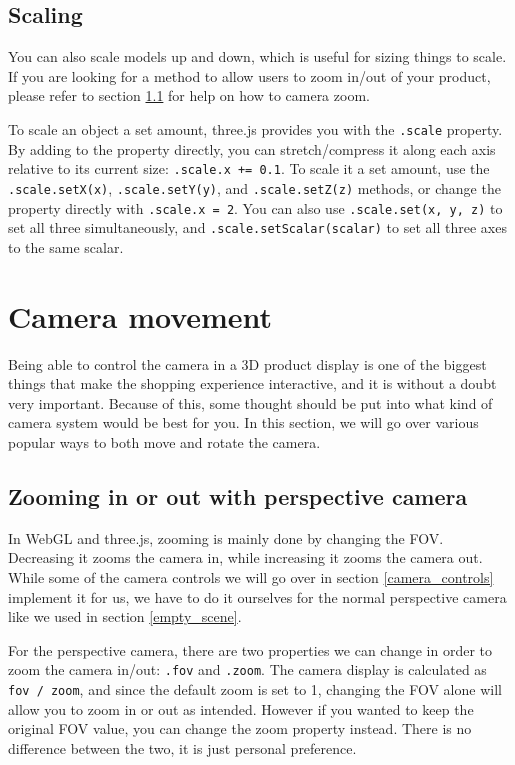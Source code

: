 \documentclass[10pt,final,journal,compsoc]{IEEEtran}
\begin{document}
    \subsection{Scaling}
    You can also scale models up and down, which is useful for sizing things to scale. If you are looking for a method to allow users to zoom in/out of your product, please refer to section \ref{camera_zoom} for help on how to camera zoom.
    
    To scale an object a set amount, three.js provides you with the \verb|.scale| property. By adding to the property directly, you can stretch/compress it along each axis relative to its current size: \verb|.scale.x += 0.1|. To scale it a set amount, use the \verb|.scale.setX(x)|, \verb|.scale.setY(y)|, and \verb|.scale.setZ(z)| methods, or change the property directly with \verb|.scale.x = 2|. You can also use \verb|.scale.set(x, y, z)| to set all three simultaneously, and \verb|.scale.setScalar(scalar)| to set all three axes to the same scalar. 



\section{Camera movement}
Being able to control the camera in a 3D product display is one of the biggest things that make the shopping experience interactive, and it is without a doubt very important. Because of this, some thought should be put into what kind of camera system would be best for you. In this section, we will go over various popular ways to both move and rotate the camera.

    \subsection{Zooming in or out with perspective camera} \label{camera_zoom}
    In WebGL and three.js, zooming is mainly done by changing the FOV. Decreasing it zooms the camera in, while increasing it zooms the camera out. While some of the camera controls we will go over in section \ref{camera_controls} implement it for us, we have to do it ourselves for the normal perspective camera like we used in section \ref{empty_scene}.
    
    For the perspective camera, there are two properties we can change in order to zoom the camera in/out: \verb|.fov| and \verb|.zoom|. The camera display is calculated as \verb|fov / zoom|, and since the default zoom is set to 1, changing the FOV alone will allow you to zoom in or out as intended. However if you wanted to keep the original FOV value, you can change the zoom property instead. There is no difference between the two, it is just personal preference.
    
\end{document}
